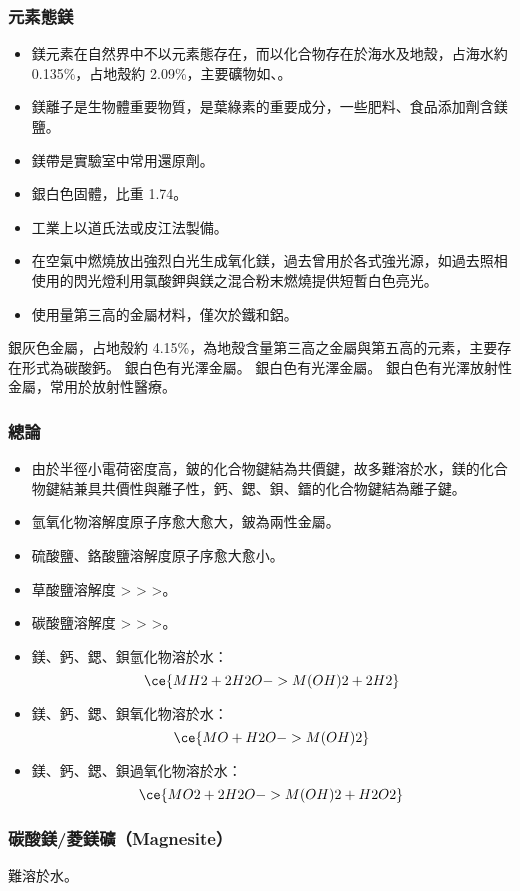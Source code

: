 \documentclass[a4paper,12pt]{report}
\begin{document}
\begin{itemize}
\begin{itemize}
\subsubsection{元素態鎂}
\begin{itemize}
\item 鎂元素在自然界中不以元素態存在，而以化合物存在於海水及地殼，占海水約 0.135\%，占地殼約 2.09\%，主要礦物如、。
\item 鎂離子是生物體重要物質，是葉綠素的重要成分，一些肥料、食品添加劑含鎂鹽。
\item 鎂帶是實驗室中常用還原劑。
\item 銀白色固體，比重 1.74。
\item 工業上以道氏法或皮江法製備。
\item 在空氣中燃燒放出強烈白光生成氧化鎂，過去曾用於各式強光源，如過去照相使用的閃光燈利用氯酸鉀與鎂之混合粉末燃燒提供短暫白色亮光。
\item 使用量第三高的金屬材料，僅次於鐵和鋁。
\end{itemize}
銀灰色金屬，占地殼約 4.15\%，為地殼含量第三高之金屬與第五高的元素，主要存在形式為碳酸鈣。
銀白色有光澤金屬。
銀白色有光澤金屬。
銀白色有光澤放射性金屬，常用於放射性醫療。
\subsubsection{總論}
\begin{itemize}
\item 由於半徑小電荷密度高，鈹的化合物鍵結為共價鍵，故多難溶於水，鎂的化合物鍵結兼具共價性與離子性，鈣、鍶、鋇、鐳的化合物鍵結為離子鍵。
\item 氫氧化物溶解度原子序愈大愈大，鈹為兩性金屬。
\item 硫酸鹽、鉻酸鹽溶解度原子序愈大愈小。
\item 草酸鹽溶解度 > > >。
\item 碳酸鹽溶解度 > > >。
\item 鎂、鈣、鍶、鋇氫化物溶於水：
\[\ce{MH2 + 2H2O -> M(OH)2 + 2H2}\]
\item 鎂、鈣、鍶、鋇氧化物溶於水：
\[\ce{MO + H2O -> M(OH)2}\]
\item 鎂、鈣、鍶、鋇過氧化物溶於水：
\[\ce{MO2 + 2H2O -> M(OH)2 + H2O2}\]
\end{itemize}
\subsubsection{碳酸鎂/菱鎂礦（Magnesite）}
難溶於水。

\end{itemize}
\end{itemize}
\end{document}
